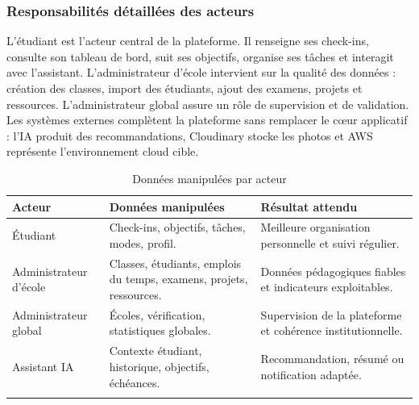 \documentclass{rapportENSET}
\begin{document}
\subsubsection*{Responsabilités détaillées des acteurs}
L'étudiant est l'acteur central de la plateforme. Il renseigne ses check-ins, consulte son tableau de bord, suit ses objectifs, organise ses tâches et interagit avec l'assistant. L'administrateur d'école intervient sur la qualité des données : création des classes, import des étudiants, ajout des examens, projets et ressources. L'administrateur global assure un rôle de supervision et de validation. Les systèmes externes complètent la plateforme sans remplacer le cœur applicatif : l'IA produit des recommandations, Cloudinary stocke les photos et AWS représente l'environnement cloud cible.

\begin{longtable}{@{}L{0.24\textwidth}L{0.34\textwidth}L{0.32\textwidth}@{}}
\toprule
\textbf{Acteur} & \textbf{Données manipulées} & \textbf{Résultat attendu} \\
\midrule
\endhead
Étudiant & Check-ins, objectifs, tâches, modes, profil. & Meilleure organisation personnelle et suivi régulier. \\
Administrateur d'école & Classes, étudiants, emplois du temps, examens, projets, ressources. & Données pédagogiques fiables et indicateurs exploitables. \\
Administrateur global & Écoles, vérification, statistiques globales. & Supervision de la plateforme et cohérence institutionnelle. \\
Assistant IA & Contexte étudiant, historique, objectifs, échéances. & Recommandation, résumé ou notification adaptée. \\
\bottomrule
\caption{Données manipulées par acteur}
\end{longtable}
\end{document}
